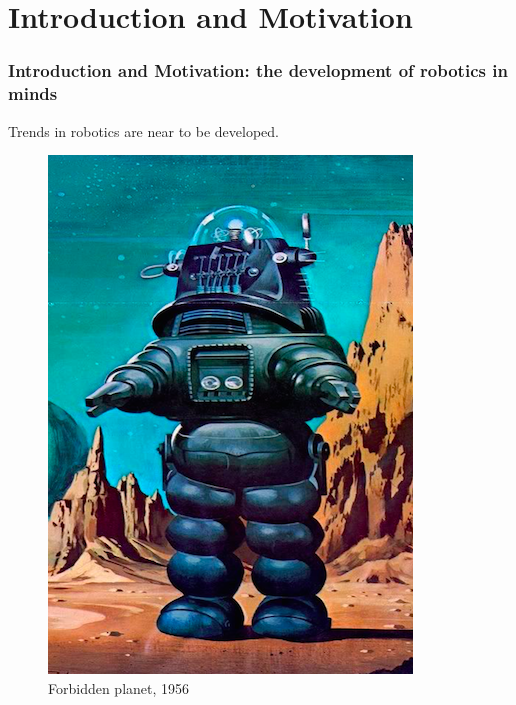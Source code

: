 \documentclass{beamer}
\begin{document}
	\section*{Introduction and Motivation}
	\begin{frame}
		\frametitle{Introduction and Motivation: the development of robotics in minds}
		\centering
		Trends in robotics are near to be developed.
		
		\begin{figure}[h!]
			\begin{minipage}[H]{0.20\linewidth}
				\includegraphics[width=\linewidth]{presentation_images/1}
				\caption{Forbidden planet, 1956}
			\end{minipage}
			\hfill
			\begin{minipage}[H]{0.20\linewidth}

\end{minipage}
\end{figure}
\end{frame}
\end{document}
